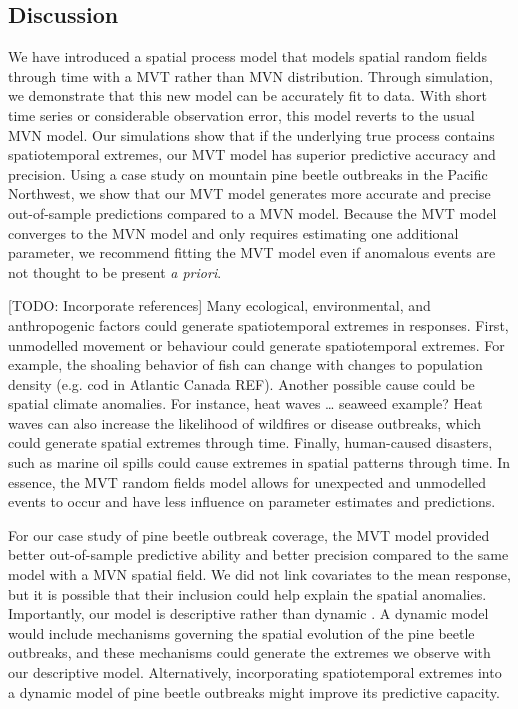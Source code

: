 \documentclass[12pt,english]{article}
\begin{document}
\begin{spacing}{1.9}
\section{Discussion}

We have introduced a spatial process model that models spatial random fields
through time with a MVT rather than MVN distribution. Through simulation, we
demonstrate that this new model can be accurately fit to data. With short time
series or considerable observation error, this model reverts to the usual MVN
model. Our simulations show that if
the underlying true process contains spatiotemporal extremes, our MVT model has
superior predictive accuracy and precision. Using a case study on mountain pine beetle
outbreaks in the Pacific
Northwest, we show that our MVT model generates more accurate and precise
out-of-sample predictions compared to a MVN model. Because the MVT model
converges to the MVN model and only requires estimating one
additional parameter, we recommend fitting the MVT model even if anomalous
events are not thought to be present \textit{a priori}.

[TODO: Incorporate references] Many ecological, environmental, and anthropogenic
factors could generate spatiotemporal extremes in responses. First, unmodelled
movement or behaviour could generate spatiotemporal
extremes. For example, the shoaling behavior of fish can change with changes to
population density (e.g. cod in Atlantic Canada REF). Another possible
cause could be spatial climate anomalies. For instance, heat waves \ldots
seaweed example? Heat waves can also increase the likelihood of wildfires or
disease outbreaks, which could generate spatial extremes through time. Finally,
human-caused disasters, such as marine oil spills could cause extremes in
spatial patterns through time. In essence, the MVT random fields model allows
for unexpected and unmodelled events to occur and have less influence on
parameter estimates and predictions.

For our case study of pine beetle outbreak coverage, the MVT model provided
better out-of-sample predictive ability and better precision compared to the same model
with a MVN spatial field. We did not link covariates to the mean response, but it is
possible that their inclusion could help explain the spatial anomalies. Importantly,
our model is descriptive rather than dynamic \citep{cressie2011}.
A dynamic model would include mechanisms governing the spatial evolution of the
pine beetle outbreaks, and these mechanisms could generate the extremes we
observe with our descriptive model. Alternatively, incorporating spatiotemporal
extremes into a dynamic model of pine beetle outbreaks might improve its
predictive capacity.


\end{spacing}
\end{document}
